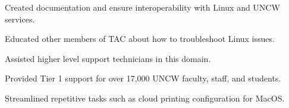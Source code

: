 \begin{cventries}
{\begin{cvsubentries}
        {
          \begin{cvsubitems}
            \item {Created documentation and ensure interoperability with Linux and UNCW services.}
            \item {Educated other members of TAC about how to troubleshoot Linux issues.}
            \item {Assisted higher level support technicians in this domain.}
          \end{cvsubitems}
        }
        {
          \begin{cvsubitems}
            \item {Provided Tier 1 support for over 17,000 UNCW faculty, staff, and students.}
            \item {Streamlined repetitive tasks such as cloud printing configuration for MacOS.}
          \end{cvsubitems}
        }
      \end{cvsubentries}
    }

\end{cventries}
